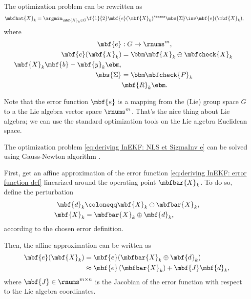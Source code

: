 The optimization problem can be rewritten as
\begin{align}
    \label{eq:deriving InEKF: NLS et SigmaInv e}
    \mbfhat{X}_{k} &= \argmin_{\mbf{X}_{k}\in G} \f{1}{2}\mbf{e}(\mbf{X}_{k})^{\trans}\mbs{\Sigma}\inv\mbf{e}(\mbf{X}_{k}),
\end{align}
where
\begin{align}
    \label{eq:deriving InEKF: error function def}
    \mbf{e} &: G \to \rnums^{m},\\
    \mbf{e}(\mbf{X}_{k}) &=
    \bbm
        \mbf{X}_{k} \ominus \mbfcheck{X}_{k}\\
        \mbf{X}_{k}\mbf{b} - \mbf{y}_{k}
    \ebm,\\
    \mbs{\Sigma} &=
    \bbm
        \mbfcheck{P}_{k} & \\ & \mbf{R}_{k}
    \ebm.
\end{align}
\begin{remark}
    Note that the error function $\mbf{e}$ is a mapping from the (Lie) group space $G$ to a the Lie algebra vector space $\rnums^{m}$. That's the nice thing about Lie algebra; we can use the standard optimization tools on the Lie algebra Euclidean space.
\end{remark}

The optimization problem \eqref{eq:deriving InEKF: NLS et SigmaInv e} can be solved using Gauss-Newton algorithm \cite{Nocedal_Numerical_2006, Barfoot_State_2017, Dellaert_Factor_2017}.

First, get an affine approximation of the error function \eqref{eq:deriving InEKF: error function def} linearized around the operating point $\mbfbar{X}_{k}$. To do so, define the perturbation 
\begin{align}
    \mbf{d}_{k} &\coloneqq \mbf{X}_{k}\ominus\mbfbar{X}_{k},\\
    \label{eq:deriving InEKF: X_k = Xbar oplus dk}
    \mbf{X}_{k} &= \mbfbar{X}_{k} \oplus\mbf{d}_{k},
\end{align}
according to the chosen error definition.

Then, the affine approximation can be written as
\begin{align}
    \label{eq:InEKF derivation: error affine approx}
    \mbf{e}(\mbf{X}_{k}) &= \mbf{e}(\mbfbar{X}_{k}\oplus\mbf{d}_{k})\\
    &\approx \mbf{e}\left( \mbfbar{X}_{k}  \right) + \mbf{J}\mbf{d}_{k},
\end{align}
where $\mbf{J}\in\rnums^{m\times n}$ is the Jacobian of the error function with respect to the Lie algebra coordinates.

